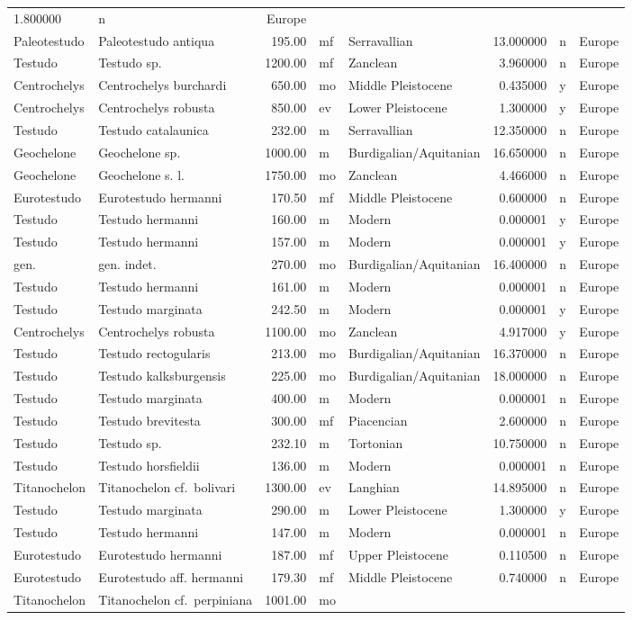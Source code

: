 \begin{landscape}
\begin{longtable}[]{@{}llrllrll@{}}
	1.800000 & n & Europe\tabularnewline
	Paleotestudo & Paleotestudo antiqua & 195.00 & mf & Serravallian &
	13.000000 & n & Europe\tabularnewline
	Testudo & Testudo sp. & 1200.00 & mf & Zanclean & 3.960000 & n &
	Europe\tabularnewline
	Centrochelys & Centrochelys burchardi & 650.00 & mo & Middle Pleistocene
	& 0.435000 & y & Europe\tabularnewline
	Centrochelys & Centrochelys robusta & 850.00 & ev & Lower Pleistocene &
	1.300000 & y & Europe\tabularnewline
	Testudo & Testudo catalaunica & 232.00 & m & Serravallian & 12.350000 &
	n & Europe\tabularnewline
	Geochelone & Geochelone sp. & 1000.00 & m & Burdigalian/Aquitanian &
	16.650000 & n & Europe\tabularnewline
	Geochelone & Geochelone s. l. & 1750.00 & mo & Zanclean & 4.466000 & n &
	Europe\tabularnewline
	Eurotestudo & Eurotestudo hermanni & 170.50 & mf & Middle Pleistocene &
	0.600000 & n & Europe\tabularnewline
	Testudo & Testudo hermanni & 160.00 & m & Modern & 0.000001 & y &
	Europe\tabularnewline
	Testudo & Testudo hermanni & 157.00 & m & Modern & 0.000001 & y &
	Europe\tabularnewline
	gen. & gen. indet. & 270.00 & mo & Burdigalian/Aquitanian & 16.400000 &
	n & Europe\tabularnewline
	Testudo & Testudo hermanni & 161.00 & m & Modern & 0.000001 & n &
	Europe\tabularnewline
	Testudo & Testudo marginata & 242.50 & m & Modern & 0.000001 & y &
	Europe\tabularnewline
	Centrochelys & Centrochelys robusta & 1100.00 & mo & Zanclean & 4.917000
	& y & Europe\tabularnewline
	Testudo & Testudo rectogularis & 213.00 & mo & Burdigalian/Aquitanian &
	16.370000 & n & Europe\tabularnewline
	Testudo & Testudo kalksburgensis & 225.00 & mo & Burdigalian/Aquitanian
	& 18.000000 & n & Europe\tabularnewline
	Testudo & Testudo marginata & 400.00 & m & Modern & 0.000001 & n &
	Europe\tabularnewline
	Testudo & Testudo brevitesta & 300.00 & mf & Piacencian & 2.600000 & n &
	Europe\tabularnewline
	Testudo & Testudo sp. & 232.10 & m & Tortonian & 10.750000 & n &
	Europe\tabularnewline
	Testudo & Testudo horsfieldii & 136.00 & m & Modern & 0.000001 & n &
	Europe\tabularnewline
	Titanochelon & Titanochelon cf.~bolivari & 1300.00 & ev & Langhian &
	14.895000 & n & Europe\tabularnewline
	Testudo & Testudo marginata & 290.00 & m & Lower Pleistocene & 1.300000
	& y & Europe\tabularnewline
	Testudo & Testudo hermanni & 147.00 & m & Modern & 0.000001 & n &
	Europe\tabularnewline
	Eurotestudo & Eurotestudo hermanni & 187.00 & mf & Upper Pleistocene &
	0.110500 & n & Europe\tabularnewline
	Eurotestudo & Eurotestudo aff. hermanni & 179.30 & mf & Middle
	Pleistocene & 0.740000 & n & Europe\tabularnewline
	Titanochelon & Titanochelon cf.~perpiniana & 1001.00 & mo &

\end{longtable}
\end{landscape}
